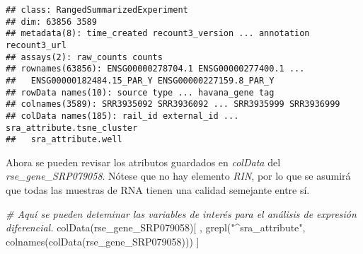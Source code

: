 \documentclass[
]{article}
\newenvironment{Shaded}{\begin{snugshade}}{\end{snugshade}}
\newcommand{\CommentTok}[1]{\textcolor[rgb]{0.56,0.35,0.01}{\textit{#1}}}
\newcommand{\FunctionTok}[1]{\textcolor[rgb]{0.00,0.00,0.00}{#1}}
\newcommand{\NormalTok}[1]{#1}
\newcommand{\StringTok}[1]{\textcolor[rgb]{0.31,0.60,0.02}{#1}}
\begin{document}
\begin{verbatim}
## class: RangedSummarizedExperiment 
## dim: 63856 3589 
## metadata(8): time_created recount3_version ... annotation recount3_url
## assays(2): raw_counts counts
## rownames(63856): ENSG00000278704.1 ENSG00000277400.1 ...
##   ENSG00000182484.15_PAR_Y ENSG00000227159.8_PAR_Y
## rowData names(10): source type ... havana_gene tag
## colnames(3589): SRR3935092 SRR3936092 ... SRR3935999 SRR3936999
## colData names(185): rail_id external_id ... sra_attribute.tsne_cluster
##   sra_attribute.well
\end{verbatim}

Ahora se pueden revisar los atributos guardados en \emph{colData} del
\emph{rse\_gene\_SRP079058}. Nótese que no hay elemento \emph{RIN}, por
lo que se asumirá que todas las muestras de RNA tienen una calidad
semejante entre sí.

\begin{Shaded}
\begin{Highlighting}[]
\CommentTok{\# Aquí se pueden deteminar las variables de interés para el análisis de expresión diferencial.}
\FunctionTok{colData}\NormalTok{(rse\_gene\_SRP079058)[}
\NormalTok{    ,}
    \FunctionTok{grepl}\NormalTok{(}\StringTok{"\^{}sra\_attribute"}\NormalTok{, }\FunctionTok{colnames}\NormalTok{(}\FunctionTok{colData}\NormalTok{(rse\_gene\_SRP079058)))}
\NormalTok{]}
\end{Highlighting}
\end{Shaded}
\end{document}
